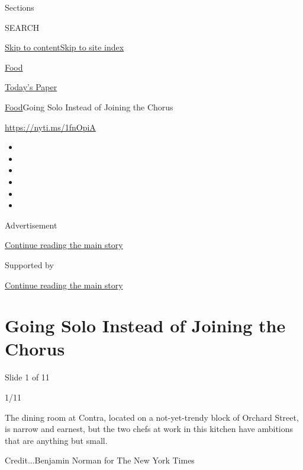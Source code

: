 Sections

SEARCH

\protect\hyperlink{site-content}{Skip to
content}\protect\hyperlink{site-index}{Skip to site index}

\href{https://www.nytimes3xbfgragh.onion/section/food}{Food}

\href{https://myaccount.nytimes3xbfgragh.onion/auth/login?response_type=cookie\&client_id=vi}{}

\href{https://www.nytimes3xbfgragh.onion/section/todayspaper}{Today's
Paper}

\href{/section/food}{Food}\textbar{}Going Solo Instead of Joining the
Chorus

\url{https://nyti.ms/1fnOpiA}

\begin{itemize}
\item
\item
\item
\item
\item
\item
\end{itemize}

Advertisement

\protect\hyperlink{after-top}{Continue reading the main story}

Supported by

\protect\hyperlink{after-sponsor}{Continue reading the main story}

\hypertarget{going-solo-instead-of-joining-the-chorus}{%
\section{Going Solo Instead of Joining the
Chorus}\label{going-solo-instead-of-joining-the-chorus}}

Slide 1 of 11

1/11

The dining room at Contra, located on a not-yet-trendy block of Orchard
Street, is narrow and earnest, but the two chefs at work in this kitchen
have ambitions that are anything but small.

Credit...Benjamin Norman for The New York Times

